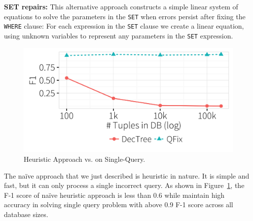 \noindent
\textbf{SET repairs:}
This alternative approach constructs 
a simple linear system of equations to solve the parameters in the \texttt{SET}
when errors persist after fixing the \texttt{WHERE} clause:
For each expression in the \texttt{SET} clause we create a
linear equation, using unknown variables to represent any parameters
in the \texttt{SET} expression. 
  \begin{figure}[h]
  \centering
    \includegraphics[width = .6\columnwidth]{figures/heuristicacc}
    \vspace*{-.1in}
    \caption{Heuristic Approach vs. \sys on Single-Query. }
    \label{f:heuristic_acc} 
  \end{figure}
  \vspace*{-0.1in}
  
The na\"ive approach that we just described is heuristic in nature. It
is simple and fast, but it can only process a single incorrect query. As shown in
Figure~\ref{f:heuristic_acc}, the F-1 score of na\"ive heuristic approach is less 
than 0.6 while \sys maintain high accuracy in solving single query problem with
above 0.9 F-1 score across all database sizes. 
\fi
